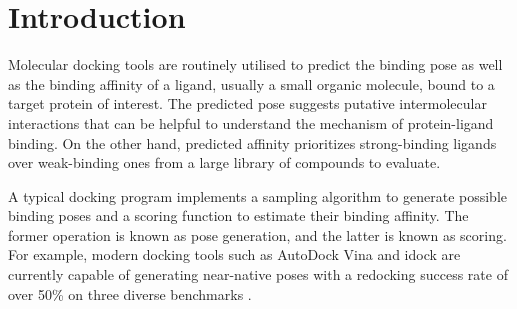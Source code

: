\documentclass[twocolumn]{bmcart}
\begin{document}


\section*{Introduction}

Molecular docking tools are routinely utilised to predict the binding pose as well as the binding affinity of a ligand, usually a small organic molecule, bound to a target protein of interest. The predicted pose suggests putative intermolecular interactions that can be helpful to understand the mechanism of protein-ligand binding. On the other hand, predicted affinity prioritizes strong-binding ligands over weak-binding ones from a large library of compounds to evaluate.

A typical docking program implements a sampling algorithm to generate possible binding poses and a scoring function to estimate their binding affinity. The former operation is known as pose generation, and the latter is known as scoring. For example, modern docking tools such as AutoDock Vina \cite{595} and idock \cite{1362} are currently capable of generating near-native poses with a redocking success rate of over 50\% on three diverse benchmarks \cite{1362}.
\end{document}
